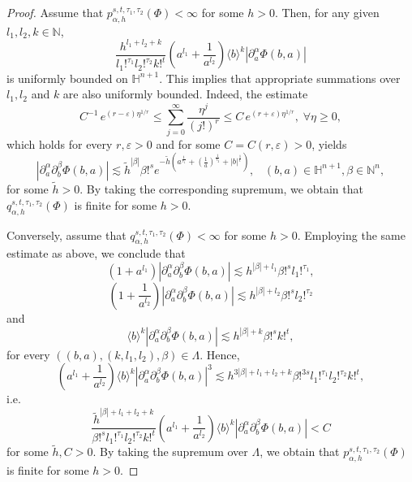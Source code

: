 \documentclass[reqno,12pt]{amsart}
\theoremstyle{plain}
\theoremstyle{definition}
\theoremstyle{remark}
\begin{document}
\begin{proof}
Assume that $ p_{\alpha, h}^{s, t, \tau_1, \tau_2} (\Phi) < \infty $ for some $h>0$.
Then, for any given $ l_1, l_2, k \in \mathbb{N} $,
$$
\frac{h^{l_1 + l_2 + k}}{l_1!^{\tau_1} l_2!^{\tau_2} k!^{t}}
\left(a^{l_1} + \frac{1}{a^{l_2}}\right) \langle b \rangle^{k}
| \partial_a^{\alpha} \Phi(b,a)|
$$
is uniformly bounded on $\mathbb{H}^{n+1}.$
This implies that appropriate summations over
$ l_1, l_2$ and $ k $ are also uniformly bounded.
Indeed, the estimate
$$
C^{-1} \, e^{(r - \varepsilon) \eta^{1/r}}
\leq \sum_{j = 0}^{\infty} \frac{\eta^j}{(j!)^r} \leq C \, e^{(r + \varepsilon)
\eta^{1/r}}, \; \forall \eta \geq 0,
$$
which holds for every $ r, \varepsilon > 0 $ and for some $ C = C(r, \varepsilon) > 0$, yields
$$
|\partial_a^{\alpha} \partial_b^{\beta} \Phi(b,a)| \lesssim \tilde{h}^{|\beta|} \beta!^s e^{-
\tilde{h} \left(a^{\frac{1}{\tau_1}} +
(\frac{1}{a})^{\frac{1}{\tau_2}} + |b|^{\frac{1}{t}}\right)},
\;\;\; (b, a) \in \mathbb{H}^{n+1}, \beta \in \mathbb{N}^n,
$$
for some $ \tilde{h} > 0 $. By taking the corresponding supremum, we obtain that
$ q_{\alpha, h}^{s, t, \tau_1, \tau_2}(\Phi) $ is finite for some  $h>0$.

\par

Conversely, assume that $ q_{\alpha, h}^{s, t, \tau_1, \tau_2}(\Phi) < \infty $ for some  $h>0$.
Employing the same estimate as above, we conclude that
$$
(1 + a^{l_1}) |\partial_a^{\alpha} \partial_b^{\beta} \Phi(b,a)| \lesssim h^{|\beta| + l_1}
\beta!^s l_1!^{\tau_1},
$$
$$ \left(1 + \frac{1}{a^{l_2}}\right)
|\partial_a^{\alpha} \partial_b^{\beta} \Phi(b,a)| \lesssim h^{|\beta| + l_2} \beta!^s
l_2!^{\tau_2}
$$
and
$$ \langle b \rangle^k | \partial_a^{\alpha} \partial_b^{\beta} \Phi(b,a)|
\lesssim h^{|\beta| + k} \beta!^s k!^t,
$$
for every $  ((b, a), (k, l_1, l_2), \beta) \in \Lambda$.
Hence,
$$
\left(a^{l_1} + \frac{1}{a^{l_2}}\right) \langle b \rangle^{k}
|\partial_a^{\alpha} \partial_b^{\beta} \Phi(b,a)|^3 \lesssim h^{3|\beta| + l_1 + l_2 + k}
\beta!^{3s} l_1!^{\tau_1} l_2!^{\tau_2} k!^t,
$$
i.e.
$$
\frac{\tilde{h}^{|\beta| + l_1 + l_2 + k}}{  \beta!^s l_1!^{\tau_1} l_2!^{\tau_2} k!^t}
\left(a^{l_1} + \frac{1}{a^{l_2}}\right) \langle b \rangle^{k}
|\partial_a^{\alpha} \partial_b^{\beta} \Phi(b,a)|
< C
$$
for some $ \tilde{h},C >0. $ By taking the supremum over  $ \Lambda $, we obtain that
$ p_{\alpha, h}^{s, t, \tau_1, \tau_2} (\Phi) $ is finite for some $h>0$.

\end{proof}
\end{document}
